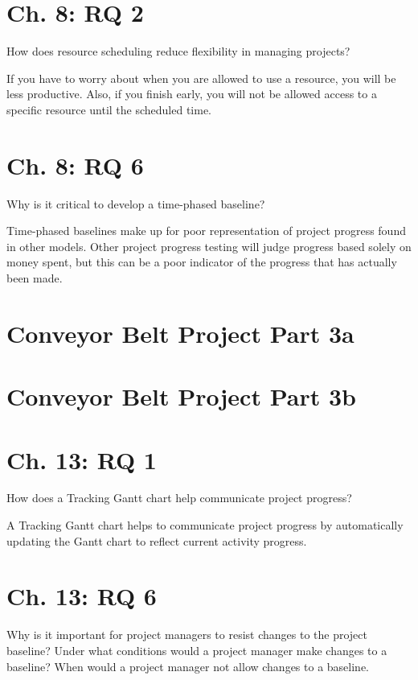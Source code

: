 \documentclass[12pt, letter]{extarticle}
\begin{document}
\section{Ch. 8: RQ 2}
How does resource scheduling reduce flexibility in managing projects?

If you have to worry about when you are allowed to use a resource, you will be less productive.
Also, if you finish early, you will not be allowed access to a specific resource until the scheduled time.

\section{Ch. 8: RQ 6}
Why is it critical to develop a time-phased baseline?

Time-phased baselines make up for poor representation of project progress found in other models.
Other project progress testing will judge progress based solely on money spent, but this can be a poor indicator of the progress that has actually been made.

\section{Conveyor Belt Project Part 3a}
\section{Conveyor Belt Project Part 3b}

\section{Ch. 13: RQ 1}
How does a Tracking Gantt chart help communicate project progress?

A Tracking Gantt chart helps to communicate project progress by automatically updating the Gantt chart to reflect current activity progress.
\section{Ch. 13: RQ 6}
Why is it important for project managers to resist changes to the project baseline?  Under what conditions would a project manager make changes to a baseline? When would a project manager not allow changes to a baseline.
\end{document}
